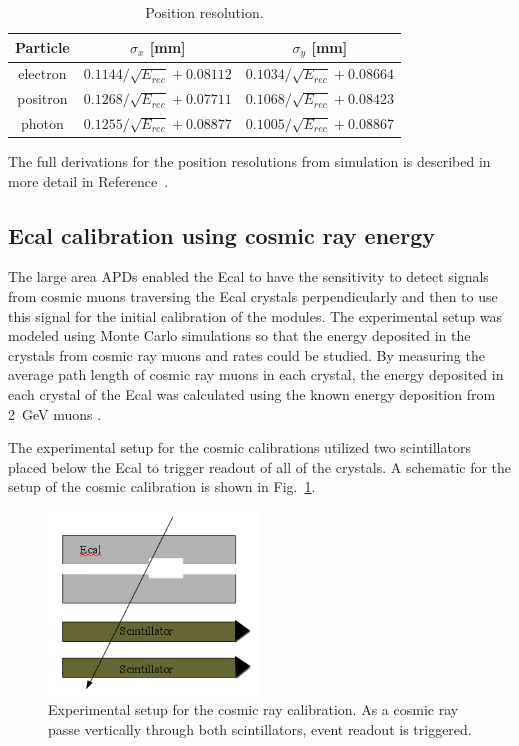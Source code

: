 \documentclass[12pt]{report}
\begin{document}
\begin{table}[H]
\caption{Position resolution.}
\label{tab:PosnResTable}
\centering
\begin{tabular}{|c|c|c|}
\toprule
Particle & $\sigma_x$ [mm] & $\sigma_y$ [mm] \\
\midrule
electron & $0.1144/\sqrt{E_{rec}}+0.08112$ & $0.1034/\sqrt{E_{rec}}+0.08664$ \\
positron & $0.1268/\sqrt{E_{rec}}+0.07711$ & $0.1068/\sqrt{E_{rec}}+0.08423$ \\
photon & $0.1255/\sqrt{E_{rec}}+0.08877$ & $0.1005/\sqrt{E_{rec}}+0.08867$ \\
\bottomrule
\end{tabular}
\end{table}

The full derivations for the position resolutions from simulation is described in more detail in Reference~\cite{Garcon}.

\subsection{Ecal calibration using cosmic ray energy}

The large area APDs enabled the Ecal to have the sensitivity to detect signals from cosmic muons traversing the Ecal crystals perpendicularly and then to use this signal for the initial calibration of the modules. The experimental setup was modeled using Monte Carlo simulations so that the energy deposited in the crystals from cosmic ray muons and rates could be studied. By measuring the average path length of cosmic ray muons in each crystal, the energy deposited in each crystal of the Ecal was calculated using the known energy deposition from 2~GeV muons \cite{Olive}. 

The experimental setup for the cosmic calibrations utilized two scintillators placed below the Ecal to trigger readout of all of the crystals. A schematic for the setup of the cosmic calibration is shown in Fig.~\ref{Figure:cosmicScheme}.


\begin{figure}[H]
  \centering
      \includegraphics[width=0.5\textwidth]{pics/performance/cosmicschematic.png}
  \caption[Setup for Ecal cosmic ray calibration]{Experimental setup for the cosmic ray calibration. As a cosmic ray passe vertically through both scintillators, event readout is triggered.}
  \label{Figure:cosmicScheme}
\end{figure}
\end{document}
